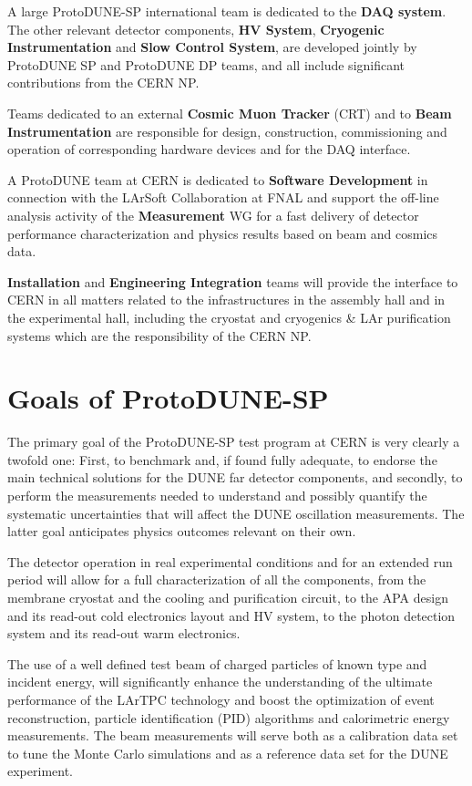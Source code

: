 A large ProtoDUNE-SP international team is dedicated to the {\bf DAQ system}. 
The other relevant detector components,  {\bf HV System},  {\bf Cryogenic Instrumentation} and {\bf Slow Control System}, are developed jointly by ProtoDUNE SP and ProtoDUNE DP teams, and all include significant contributions from the CERN NP.

Teams dedicated to an external {\bf Cosmic Muon Tracker} (CRT) and to {\bf Beam Instrumentation} are responsible for design, construction, commissioning and operation of corresponding hardware devices and for the DAQ interface.

A ProtoDUNE team at CERN is dedicated to {\bf Software Development} in connection with the LArSoft Collaboration at FNAL and support the off-line analysis activity of the {\bf Measurement} WG for a fast delivery of detector performance characterization and physics results based on beam and cosmics data.

{\bf Installation} and {\bf Engineering Integration} teams will provide the interface to CERN in all matters related to the infrastructures in the assembly hall and in the experimental hall, including the cryostat and cryogenics \& LAr purification systems which are the responsibility of
the CERN NP.

\section{Goals of ProtoDUNE-SP}
The primary goal of the ProtoDUNE-SP test program at CERN is very clearly a twofold one: First,  to benchmark and, if found fully adequate, to endorse the main technical solutions for the DUNE far detector components, and secondly, to perform the measurements needed to understand and possibly quantify the systematic uncertainties that will affect the DUNE oscillation measurements. The latter goal anticipates physics outcomes relevant on their own.

The detector operation in real experimental conditions and for an extended run period will allow for a full characterization of all 
the components, from the membrane cryostat and the cooling and purification circuit, to the APA design and its read-out cold electronics layout and HV system, to the photon detection system and its read-out warm electronics.

The use of a well defined test beam of charged particles of known type and incident  energy, will significantly enhance the understanding of the ultimate performance of the LArTPC technology and boost the optimization of event reconstruction, particle identification (PID) algorithms and calorimetric energy measurements.  The beam measurements will serve both as a calibration data set to tune the Monte Carlo simulations and as a reference data set for the DUNE experiment. 

